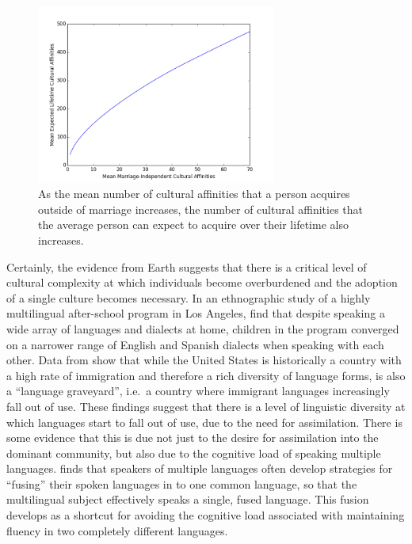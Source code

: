 \documentclass{report}
\begin{document}
\begin{figure}[htb!]
    \centering
    \includegraphics[width = 0.7\textwidth]{culture1.png}
    \caption{As the mean number of cultural affinities that a person acquires outside of marriage increases, the number of cultural affinities that the average person can expect to acquire over their lifetime also increases.}
    \label{fig:cultureplot}
\end{figure}


Certainly, the evidence from Earth suggests that there is a critical level of cultural complexity at which individuals become overburdened and the adoption of a single culture becomes necessary. In an ethnographic study of a highly multilingual after-school program in Los Angeles, \cite{orellana2016cultivating} find that despite speaking a wide array of languages and dialects at home, children in the program converged on a narrower range of English and Spanish dialects when speaking with each other. Data from \cite{rumbaut2013immigration} show that while the United States is historically a country with a high rate of immigration and therefore a rich diversity of language forms, is also a ``language graveyard'', i.e.\ a country where immigrant languages increasingly fall out of use. These findings suggest that there is a level of linguistic diversity at which languages start to fall out of use, due to the need for assimilation. There is some evidence that this is due not just to the desire for assimilation into the dominant community, but also due to the cognitive load of speaking multiple languages. \cite{matras2000fusion}
finds that speakers of multiple languages often develop strategies for ``fusing'' their spoken languages in to one common language, so that the multilingual subject effectively speaks a single, fused language. This fusion develops as a shortcut for avoiding the cognitive load associated with maintaining fluency in two completely different languages.\par 
\end{document}
